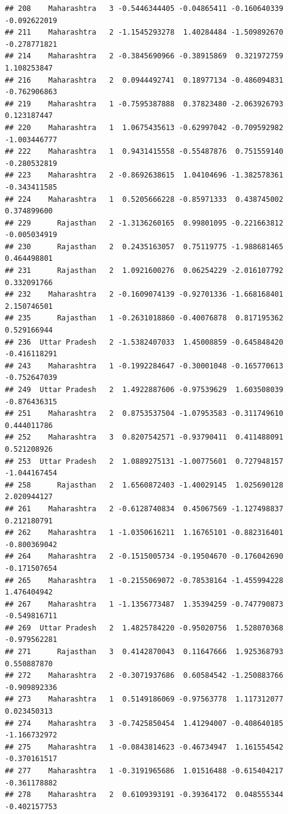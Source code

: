 \documentclass[
]{article}
\begin{document}
\begin{verbatim}
## 208    Maharashtra   3 -0.5446344405 -0.04865411 -0.160640339 -0.092622019
## 211    Maharashtra   2 -1.1545293278  1.40284484 -1.509892670 -0.278771821
## 214    Maharashtra   2 -0.3845690966 -0.38915869  0.321972759  1.108253847
## 216    Maharashtra   2  0.0944492741  0.18977134 -0.486094831 -0.762906863
## 219    Maharashtra   1 -0.7595387888  0.37823480 -2.063926793  0.123187447
## 220    Maharashtra   1  1.0675435613 -0.62997042 -0.709592982 -1.003446777
## 222    Maharashtra   1  0.9431415558 -0.55487876  0.751559140 -0.280532819
## 223    Maharashtra   2 -0.8692638615  1.04104696 -1.382578361 -0.343411585
## 224    Maharashtra   1  0.5205666228 -0.85971333  0.438745002  0.374899600
## 229      Rajasthan   2 -1.3136260165  0.99801095 -0.221663812 -0.005034919
## 230      Rajasthan   2  0.2435163057  0.75119775 -1.988681465  0.464498801
## 231      Rajasthan   2  1.0921600276  0.06254229 -2.016107792  0.332091766
## 232    Maharashtra   2 -0.1609074139 -0.92701336 -1.668168401  2.150746501
## 235      Rajasthan   1 -0.2631018860 -0.40076878  0.817195362  0.529166944
## 236  Uttar Pradesh   2 -1.5382407033  1.45008859 -0.645848420 -0.416118291
## 243    Maharashtra   1 -0.1992284647 -0.30001048 -0.165770613 -0.752647039
## 249  Uttar Pradesh   2  1.4922887606 -0.97539629  1.603508039 -0.876436315
## 251    Maharashtra   2  0.8753537504 -1.07953583 -0.311749610  0.444011786
## 252    Maharashtra   3  0.8207542571 -0.93790411  0.411488091  0.521208926
## 253  Uttar Pradesh   2  1.0889275131 -1.00775601  0.727948157 -1.044167454
## 258      Rajasthan   2  1.6560872403 -1.40029145  1.025690128  2.020944127
## 261    Maharashtra   2 -0.6128740834  0.45067569 -1.127498837  0.212180791
## 262    Maharashtra   1 -1.0350616211  1.16765101 -0.882316401 -0.800369042
## 264    Maharashtra   2 -0.1515005734 -0.19504670 -0.176042690 -0.171507654
## 265    Maharashtra   1 -0.2155069072 -0.78538164 -1.455994228  1.476404942
## 267    Maharashtra   1 -1.1356773487  1.35394259 -0.747790873 -0.549816711
## 269  Uttar Pradesh   2  1.4825784220 -0.95020756  1.528070368 -0.979562281
## 271      Rajasthan   3  0.4142870043  0.11647666  1.925368793  0.550887870
## 272    Maharashtra   2 -0.3071937686  0.60584542 -1.250883766 -0.909892336
## 273    Maharashtra   1  0.5149186069 -0.97563778  1.117312077  0.023450313
## 274    Maharashtra   3 -0.7425850454  1.41294007 -0.408640185 -1.166732972
## 275    Maharashtra   1 -0.0843814623 -0.46734947  1.161554542 -0.370161517
## 277    Maharashtra   1 -0.3191965686  1.01516488 -0.615404217 -0.361178882
## 278    Maharashtra   2  0.6109393191 -0.39364172  0.048555344 -0.402157753

\end{verbatim}
\end{document}
